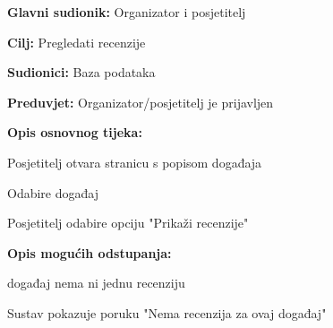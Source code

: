 					\noindent {}
					\begin{packed_item}
	
						\item \textbf{Glavni sudionik: }Organizator i posjetitelj
						\item  \textbf{Cilj:} Pregledati recenzije
						\item  \textbf{Sudionici:} Baza podataka
						\item  \textbf{Preduvjet:} Organizator/posjetitelj je prijavljen
						\item  \textbf{Opis osnovnog tijeka:}
						
						\item[] \begin{packed_enum}
	
							\item Posjetitelj otvara stranicu s popisom događaja
							\item Odabire događaj
							\item Posjetitelj odabire opciju "Prikaži recenzije"
						\end{packed_enum}
						
						\item  \textbf{Opis mogućih odstupanja:}
						
						\item[] \begin{packed_item}
	
							\item[3.a] događaj nema ni jednu recenziju
							\begin{packed_enum}
								\item Sustav pokazuje poruku "Nema recenzija za ovaj događaj"
							\end{packed_enum}
							
						\end{packed_item}
					\end{packed_item}

